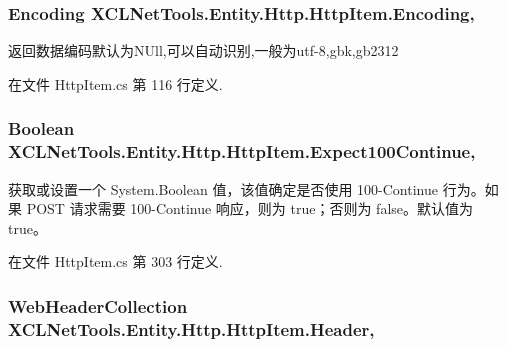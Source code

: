 \subsubsection[{\texorpdfstring{Encoding}{Encoding}}]{\setlength{\rightskip}{0pt plus 5cm}Encoding X\+C\+L\+Net\+Tools.\+Entity.\+Http.\+Http\+Item.\+Encoding\hspace{0.3cm}{\ttfamily [get]}, {\ttfamily [set]}}\hypertarget{class_x_c_l_net_tools_1_1_entity_1_1_http_1_1_http_item_aefaad52c96c7c2b692f3470b61cd75eb}{}\label{class_x_c_l_net_tools_1_1_entity_1_1_http_1_1_http_item_aefaad52c96c7c2b692f3470b61cd75eb}


返回数据编码默认为\+N\+Ull,可以自动识别,一般为utf-\/8,gbk,gb2312 



在文件 Http\+Item.\+cs 第 116 行定义.

\subsubsection[{\texorpdfstring{Expect100\+Continue}{Expect100Continue}}]{\setlength{\rightskip}{0pt plus 5cm}Boolean X\+C\+L\+Net\+Tools.\+Entity.\+Http.\+Http\+Item.\+Expect100\+Continue\hspace{0.3cm}{\ttfamily [get]}, {\ttfamily [set]}}\hypertarget{class_x_c_l_net_tools_1_1_entity_1_1_http_1_1_http_item_a378c7e8a43937807df263b1985c3b945}{}\label{class_x_c_l_net_tools_1_1_entity_1_1_http_1_1_http_item_a378c7e8a43937807df263b1985c3b945}


获取或设置一个 System.\+Boolean 值，该值确定是否使用 100-\/\+Continue 行为。如果 P\+O\+ST 请求需要 100-\/\+Continue 响应，则为 true；否则为 false。默认值为 true。 



在文件 Http\+Item.\+cs 第 303 行定义.

\subsubsection[{\texorpdfstring{Header}{Header}}]{\setlength{\rightskip}{0pt plus 5cm}Web\+Header\+Collection X\+C\+L\+Net\+Tools.\+Entity.\+Http.\+Http\+Item.\+Header\hspace{0.3cm}{\ttfamily [get]}, {\ttfamily [set]}}\hypertarget{class_x_c_l_net_tools_1_1_entity_1_1_http_1_1_http_item_a803ddfa9179e1ad325783327db8273ac}{}\label{class_x_c_l_net_tools_1_1_entity_1_1_http_1_1_http_item_a803ddfa9179e1ad325783327db8273ac}


